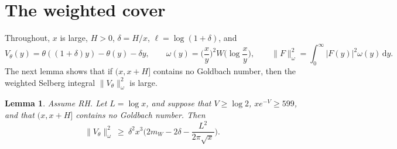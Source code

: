 \documentclass[11pt]{amsart}
\newtheorem{lemma}[theorem]{Lemma}
\theoremstyle{remark}
\newcommand{\dd}{\,\mathrm{d}}
\begin{document}
\section{The weighted cover}\label{sec:cover}

Throughout, $x$ is large, $H>0$, $\delta=H/x$, $\ell=\log(1+\delta)$, and
\[
V_\theta(y)=\theta((1+\delta)y)-\theta(y)-\delta y,\qquad \omega(y)=\Big(\frac xy\Big)^2W\Big(\log\frac xy\Big),\qquad \|F\|_\omega^2=\int_0^\infty|F(y)|^2\omega(y)\dd y.
\]
The next lemma shows that if $(x,x+H]$ contains no Goldbach number, then the weighted Selberg integral $\|V_\theta\|_\omega^2$ is large.

\begin{lemma}\label{lem:cover}
Assume RH. Let $L=\log x$, and suppose that $V\ge\log2$, $xe^{-V}\ge599$, and that $(x,x+H]$ contains no Goldbach number. Then
\[
\|V_\theta\|_\omega^2\ \ge\ \delta^2x^3\Big(2m_W-2\delta-\frac{L^2}{2\pi\sqrt x}\Big).
\]
\end{lemma}
\end{document}
